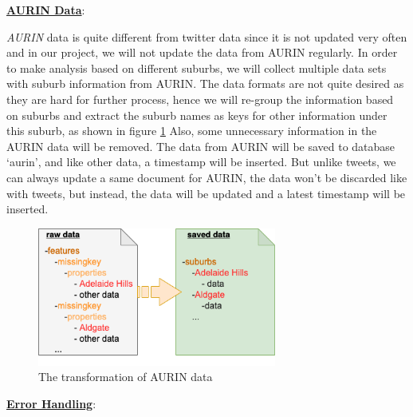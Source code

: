 \documentclass{article}
\begin{document}
\textbf{\underline{AURIN Data}}: 

\textit{AURIN} data is quite different from twitter data since it is not updated very often and in our project, we will not update the data from AURIN regularly. In order to make analysis based on different suburbs, we will collect multiple data sets with suburb information from AURIN. The data formats are not quite desired as they are hard for further process, hence we will re-group the information based on suburbs and extract the suburb names as keys for other information under this suburb, as shown in figure \ref{fig:aurindata} Also, some unnecessary information in the AURIN data will be removed. The data from AURIN will be saved to database ‘aurin’, and like other data, a timestamp will be inserted. But unlike tweets, we can always update a same document for AURIN, the data won’t be discarded like with tweets, but instead, the data will be updated and a latest timestamp will be inserted.
\begin{figure}[htp]
\centering
\includegraphics[width=0.7\textwidth]{img/aurindata.png}
\caption{The transformation of AURIN data}
\label{fig:aurindata}
\end{figure}

\textbf{\underline{Error Handling}}: 
\end{document}
